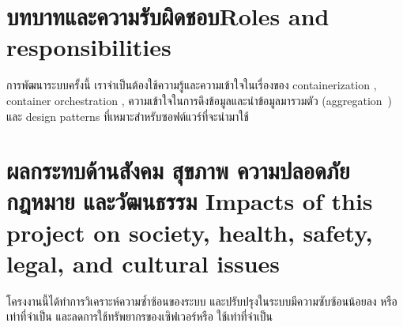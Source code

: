 \section{\ifcpe บทบาทและความรับผิดชอบ\else Roles and responsibilities\fi}
การพัฒนาระบบครั้งนี้ เราจำเป็นต้องใช้ความรู้และความเข้าใจในเรื่องของ containerization \cite{containerization}, container orchestration \cite{orchestration}, ความเข้าใจในการดึงข้อมูลและนำข้อมูลมารวมตัว (aggregation~\cite{aggregation}) และ design patterns ที่เหมาะสำหรับซอฟต์แวร์ที่จะนำมาใช้

\section{\ifcpe%
ผลกระทบด้านสังคม สุขภาพ ความปลอดภัย กฎหมาย และวัฒนธรรม
\else%
Impacts of this project on society, health, safety, legal, and cultural issues
\fi}

โครงงานนี้ได้ทำการวิเคราะห์ความซ้ำซ้อนของระบบ และปรับปรุงในระบบมีความซับซ้อนน้อยลง หรือเท่าที่จำเป็น และลดการใช้ทรัพยากรของเซิฟเวอร์หรือ ใช้เท่าที่จำเป็น
